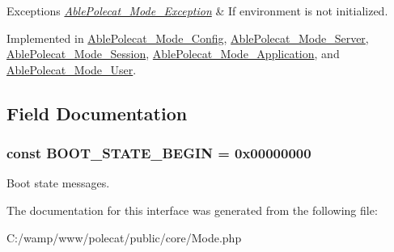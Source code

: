 \begin{DoxyExceptions}{Exceptions}
{\em \hyperlink{class_able_polecat___mode___exception}{Able\+Polecat\+\_\+\+Mode\+\_\+\+Exception}} & If environment is not initialized. \\
\hline
\end{DoxyExceptions}


Implemented in \hyperlink{class_able_polecat___mode___config_a68bdefd00518f09963ea3fa95cd2a242}{Able\+Polecat\+\_\+\+Mode\+\_\+\+Config}, \hyperlink{class_able_polecat___mode___server_a68bdefd00518f09963ea3fa95cd2a242}{Able\+Polecat\+\_\+\+Mode\+\_\+\+Server}, \hyperlink{class_able_polecat___mode___session_a68bdefd00518f09963ea3fa95cd2a242}{Able\+Polecat\+\_\+\+Mode\+\_\+\+Session}, \hyperlink{class_able_polecat___mode___application_a68bdefd00518f09963ea3fa95cd2a242}{Able\+Polecat\+\_\+\+Mode\+\_\+\+Application}, and \hyperlink{class_able_polecat___mode___user_a68bdefd00518f09963ea3fa95cd2a242}{Able\+Polecat\+\_\+\+Mode\+\_\+\+User}.



\subsection{Field Documentation}
\hypertarget{interface_able_polecat___mode_interface_a9e73b7fe972bda025da142ee02fa2ef7}{}
\subsubsection[{B\+O\+O\+T\+\_\+\+S\+T\+A\+T\+E\+\_\+\+B\+E\+G\+I\+N}]{\setlength{\rightskip}{0pt plus 5cm}const B\+O\+O\+T\+\_\+\+S\+T\+A\+T\+E\+\_\+\+B\+E\+G\+I\+N = 0x00000000}\label{interface_able_polecat___mode_interface_a9e73b7fe972bda025da142ee02fa2ef7}
Boot state messages. 

The documentation for this interface was generated from the following file\+:\begin{DoxyCompactItemize}
\item 
C\+:/wamp/www/polecat/public/core/Mode.\+php\end{DoxyCompactItemize}
